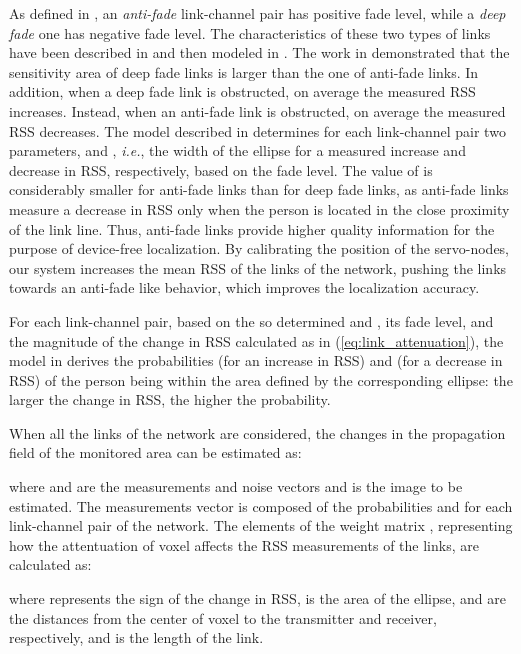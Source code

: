 \documentclass[conference]{IEEEtran}
\begin{document}
As defined in \cite{Wilson_SkewL_2011}, an \emph{anti-fade} link-channel pair  has positive fade level, while a \emph{deep fade} one has negative fade level. The characteristics of these two types of links have been described in \cite{Wilson_SkewL_2011} and then modeled in \cite{multi_scale_arxiv}. The work in \cite{Wilson_SkewL_2011} demonstrated that the sensitivity area of deep fade links is larger than the one of anti-fade links. In addition, when a deep fade link is obstructed, on average the measured RSS increases. Instead, when an anti-fade link is obstructed, on average the measured RSS decreases. The model described in \cite{multi_scale_arxiv} determines  for each link-channel pair  two parameters,  and , \emph{i.e.}, the width of the ellipse for a measured increase  and decrease  in RSS, respectively, based on the fade level. The value of  is considerably smaller for anti-fade links than for deep fade links, as anti-fade links measure a decrease in RSS only when the person is located in the close proximity of the link line. Thus, anti-fade links provide higher quality information for the purpose of device-free localization. By calibrating the position of the servo-nodes, our system increases the mean RSS of the links of the network, pushing the links towards an anti-fade like behavior, which improves the localization accuracy.

For each link-channel pair, based on the so determined  and , its fade level, and the magnitude of the change in RSS calculated as in (\ref{eq:link_attenuation}), the model in \cite{multi_scale_arxiv} derives the probabilities  (for an increase in RSS) and  (for a decrease in RSS) of the person being within the area defined by the corresponding ellipse: the larger the change in RSS, the higher the probability.

When all the  links of the network are considered, the changes in the propagation field of the monitored area can be estimated as:

where  and  are the measurements and noise vectors and  is the image to be estimated. The measurements vector is composed of the probabilities
 and  for each link-channel pair of the network. The elements of the weight matrix , representing how the attentuation of voxel  affects the RSS measurements of the links, are calculated as:

where  represents the sign of the change in RSS,  is the area of the ellipse,  and  are the distances from the center of voxel  to the transmitter and receiver, respectively, and  is the length of the link.
\end{document}
